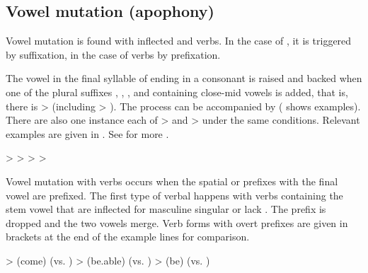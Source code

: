 \subsection{Vowel mutation (apophony)}
\label{ssec:Vowel mutation (apophony)}

Vowel mutation is found with inflected  and verbs. In the case of , it is triggered by suffixation, in the case of verbs by prefixation.

The vowel  in the final syllable of  ending in a consonant is raised and backed when one of the plural suffixes , , , and  containing close-mid vowels is added, that is, there is   >  (including  > ). The process can be accompanied by  ( shows examples). There are also one instance each of  >  and  >  under the same conditions. Relevant examples are given in . See  for more .
%
\begin{exe}
	\label{ex:a u e u e i phon}
	\begin{xlist}
		\ex	{} >  
		\ex	{} >  
		\ex	{} >  
		\ex	{} >  
	\end{xlist}
\end{exe}

Vowel mutation with verbs occurs when the spatial  or  prefixes with the final vowel  are prefixed. The first type of verbal  happens with verbs containing the stem vowel  that are inflected for masculine singular or lack  . The  prefix is dropped and the two vowels merge. Verb forms with overt  prefixes are given in brackets at the end of the example lines for comparison.
%
\begin{exe}
	\label{ex:a i e phon}
	\begin{xlist}
		\ex	{} >   (come) (vs. \tit{sa-b-irʁ-an}) 
		\ex	{} >   (be.able) (vs. \tit{a-b-irχʷ-ar})
		\ex	{} >   (be) (vs. \tit{ka-r-irg-an=da})
	\end{xlist}
\end{exe}


